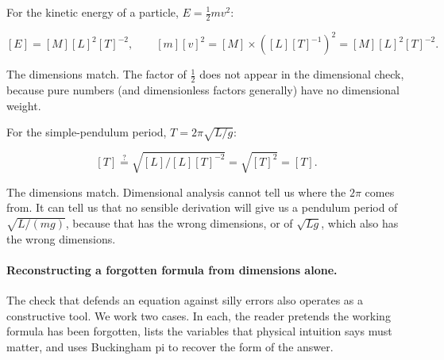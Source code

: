For the kinetic energy of a particle, $E = \tfrac{1}{2} m v^{2}$:

\[
[E] = [M][L]^{2}[T]^{-2}, \qquad
[m][v]^{2} = [M] \times ([L][T]^{-1})^{2} = [M][L]^{2}[T]^{-2}.
\]

The dimensions match. The factor of $\tfrac{1}{2}$ does not appear in
the dimensional check, because pure numbers (and dimensionless
factors generally) have no dimensional weight.

For the simple-pendulum period, $T = 2\pi \sqrt{L/g}$:

\[
[T] \stackrel{?}{=} \sqrt{[L]/[L][T]^{-2}} = \sqrt{[T]^{2}} = [T].
\]

The dimensions match. Dimensional analysis cannot tell us where the
$2\pi$ comes from. It can tell us that no sensible derivation will
give us a pendulum period of $\sqrt{L/(mg)}$, because that has the
wrong dimensions, or of $\sqrt{Lg}$, which also has the wrong
dimensions.

\paragraph{Reconstructing a forgotten formula from dimensions alone.}
The check that defends an equation against silly errors also
operates as a constructive tool. We work two cases. In each, the
reader pretends the working formula has been forgotten, lists the
variables that physical intuition says must matter, and uses
Buckingham pi to recover the form of the answer.

